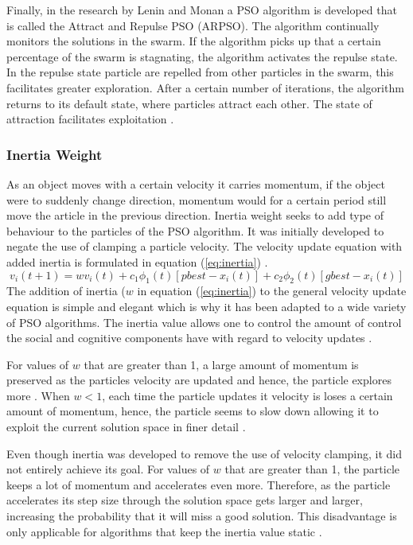Finally, in the research by Lenin and Monan a PSO algorithm is developed that is called the Attract and Repulse PSO (ARPSO). The algorithm continually monitors the solutions in the swarm. If the algorithm picks up that a certain percentage of the swarm is stagnating, the algorithm activates the repulse state. In the repulse state particle are repelled from other particles in the swarm, this facilitates greater exploration. After a certain number of iterations, the algorithm returns to its default state, where particles attract each other. The state of attraction facilitates exploitation \cite{PSOAttractRepulse}.
\subsubsection{Inertia Weight}
As an object moves with a certain velocity it carries momentum, if the object were to suddenly change direction, momentum would for a certain period still move the article in the previous direction. Inertia weight seeks to add type of behaviour to the particles of the PSO algorithm. It was initially developed to negate the use of clamping a particle velocity. The velocity update equation with added inertia is formulated in equation (\ref{eq:inertia}) \cite{FundamentalSwarm}.
\begin{equation}
v_i(t+1) = wv_i(t) + c_1\phi_{1}(t)[pbest - x_i(t)] + c_2\phi_{2}(t)[gbest - x_i(t)]\label{eq:inertia}
\end{equation}
The addition of inertia ($w$ in equation (\ref{eq:inertia}) to the general velocity update equation is simple and elegant which is why it has been adapted to a wide variety of PSO algorithms. The inertia value allows one to control the amount of control the social and cognitive components have with regard to velocity updates \cite{FundamentalSwarm}. 

For values of $w$ that are greater than 1, a large amount of momentum is preserved as the particles velocity are updated and hence, the particle explores more \cite{FundamentalSwarm}. When $w < 1$, each time the particle updates it velocity is loses a certain amount of momentum, hence, the particle seems to slow down allowing it to exploit the current solution space in finer detail \cite{FundamentalSwarm}.

Even though inertia was developed to remove the use of velocity clamping, it did not entirely achieve its goal. For values of $w$ that are greater than 1, the particle keeps a lot of momentum and accelerates even more. Therefore, as the particle accelerates its step size through the solution space gets larger and larger, increasing the probability that it will miss a good solution. This disadvantage is only applicable for algorithms that keep the inertia value static \cite{CompuIntelligenceIntro,FundamentalSwarm}.

